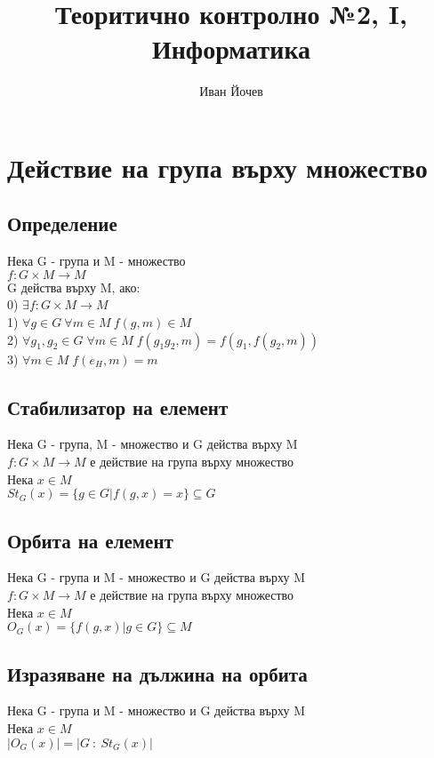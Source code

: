 \documentclass[12pt]{article}
\title{Теоритично контролно №2, I, Информатика}
\author{Иван Йочев}
\begin{document}
\maketitle

\section{Действие на група върху множество}

\subsection{Определение}
Нека G - група и M - множество\\
$f : G \times M \rightarrow M$ \\
G действа върху M, ако:\\
0) $\exists f : G \times M \rightarrow M$ \\
1) $\forall g \in G\ \forall m \in M \ f(g,m) \in M$ \\
2) $\forall g_1,g_2 \in G \; \forall m \in M \; f(g_1g_2,m) = f(g_1,f(g_2,m))$\\
3) $\forall m \in M \; f(e_H,m) = m$

\subsection{Стабилизатор на елемент}
Нека G - група, M - множество и G действа върху M\\
$f : G \times M \rightarrow M$ е действие на група върху множество\\
Нека $x \in M$ \\ 
$St_G(x) = \{g \in G|f(g,x)=x\} \subseteq G $  

\subsection{Орбита на елемент}
Нека G - група и M - множество и G действа върху M\\
$f : G \times M \rightarrow M$ е действие на група върху множество\\
Нека $x \in M$ \\
$O_G(x) = \{f(g,x)|g \in G\} \subseteq M$

\subsection{Изразяване на дължина на орбита}
Нека G - група и M - множество и G действа върху M\\
Нека $x \in M$ \\
$|O_G(x)| = |G\ :\ St_G(x)|$
\end{document}
